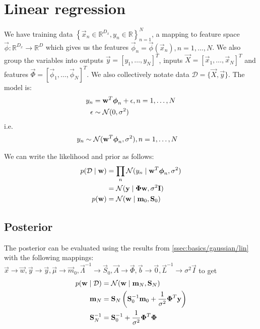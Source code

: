 \section{Linear regression}
\label{sec:models/linr}
We have training data $\left\{\vec x_n \in \mathbb R^{D_x}, y_n \in \mathbb R\right\}_{n = 1}^N$, a mapping to feature space $\vec\phi: \mathbb R^{D_x} \to \mathbb R^D$ which gives us the features $\vec \phi_n = \vec\phi(\vec x_n), n = 1, \dotsc, N$. We also group the variables into outputs $\vec y = [y_1, \dotsc, y_N]^T$, inputs $\vec X = [\vec x_1, \dotsc, \vec x_N]^T$ and features $\vec \Phi = [\vec \phi_1, \dotsc, \vec \phi_N]^T$. We also collectively notate data $\mathcal D = \{\vec X, \vec y\}$. The model is:
\begin{align}
	y_n 		&= \boldsymbol{\mathbf{w}}^T \boldsymbol{\mathbf{\phi}}_n + \epsilon, n = 1, \dotsc, N\\
	\epsilon 	&\sim \operatorname{\mathcal N}(0, \sigma^2)
\end{align}
i.e.
\begin{align}
	y_n 		&\sim \operatorname{\mathcal N}(\boldsymbol{\mathbf{w}}^T \boldsymbol{\mathbf{\phi}}_n, \sigma^2), n = 1, \dotsc, N
\end{align}

We can write the likelihood and prior as follows:
\begin{align}
	p(\mathcal D \mid \boldsymbol{\mathbf{w}})	&= \prod_n \operatorname{\mathcal N}(y_n \mid \boldsymbol{\mathbf{w}}^T \boldsymbol{\mathbf{\phi}}_n, \sigma^2) \nonumber\\
								&= \operatorname{\mathcal N}(\boldsymbol{\mathbf{y}} \mid \boldsymbol{\mathbf{\Phi}} \boldsymbol{\mathbf{w}}, \sigma^2 \boldsymbol{\mathbf{I}}) \\
	p(\boldsymbol{\mathbf{w}})					&= \operatorname{\mathcal N}(\boldsymbol{\mathbf{w}} \mid \boldsymbol{\mathbf{m}}_0, \boldsymbol{\mathbf{S}}_0)
\end{align}

\subsection{Posterior}
The posterior can be evaluated using the results from \ref{ssec:basics/gaussian/lin} with the following mappings: $\vec x \to \vec w, \vec y \to \vec y, \vec \mu \to \vec m_0, \vec \Lambda^{-1} \to \vec S_0, \vec A \to \vec \Phi, \vec b \to \vec 0, \vec L^{-1} \to \sigma^2 \vec I$ to get
\begin{align}
	p(\boldsymbol{\mathbf{w}} \mid \mathcal D)	&= \operatorname{\mathcal N}(\boldsymbol{\mathbf{w}} \mid \boldsymbol{\mathbf{m}}_N, \boldsymbol{\mathbf{S}}_N) \\
	\boldsymbol{\mathbf{m}}_N					&= \boldsymbol{\mathbf{S}}_N \left(\boldsymbol{\mathbf{S}}_0^{-1} \boldsymbol{\mathbf{m}}_0 + \frac{1}{\sigma^2} \boldsymbol{\mathbf{\Phi}}^T \boldsymbol{\mathbf{y}}\right) \\
	\boldsymbol{\mathbf{S}}_N^{-1}				&= \boldsymbol{\mathbf{S}}_0^{-1} + \frac{1}{\sigma^2} \boldsymbol{\mathbf{\Phi}}^T \boldsymbol{\mathbf{\Phi}}
\end{align}

